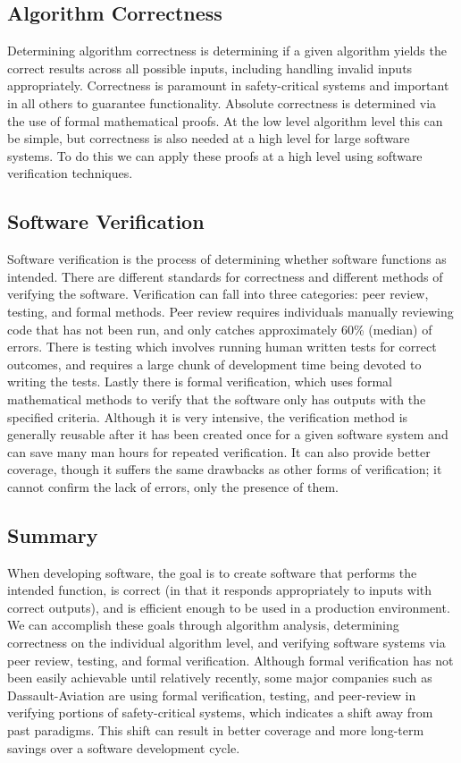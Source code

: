 \documentclass[a4paper]{article}
\begin{document}
\subsection{Algorithm Correctness}
Determining algorithm correctness is determining if a given algorithm yields the correct results across all possible inputs, including handling invalid inputs appropriately. Correctness is paramount in safety-critical systems and important in all others to guarantee functionality. Absolute correctness is determined via the use of formal mathematical proofs. At the low level algorithm level this can be simple, but correctness is also needed at a high level for large software systems. To do this we can apply these proofs at a high level using software verification techniques.

\subsection{Software Verification}
Software verification is the process of determining whether software functions as intended. There are different standards for correctness and different methods of verifying the software. Verification can fall into three categories: peer review, testing, and formal methods. Peer review requires individuals manually reviewing code that has not been run, and only catches approximately 60\% (median) of errors. There is testing which involves running human written tests for correct outcomes, and requires a large chunk of development time being devoted to writing the tests. Lastly there is formal verification, which uses formal mathematical methods to verify that the software only has outputs with the specified criteria. Although it is very intensive, the verification method is generally reusable after it has been created once for a given software system and can save many man hours for repeated verification. It can also provide better coverage, though it suffers the same drawbacks as other forms of verification; it cannot confirm the lack of errors, only the presence of them.

\subsection{Summary}
When developing software, the goal is to create software that performs the intended function, is correct (in that it responds appropriately to inputs with correct outputs), and is efficient enough to be used in a production environment. We can accomplish these goals through algorithm analysis, determining correctness on the individual algorithm level, and verifying software systems via peer review, testing, and formal verification. Although formal verification has not been easily achievable until relatively recently, some major companies such as Dassault-Aviation are using formal verification, testing, and peer-review in verifying portions of safety-critical systems, which indicates a shift away from past paradigms. This shift can result in better coverage and more long-term savings over a software development cycle.
\end{document}

